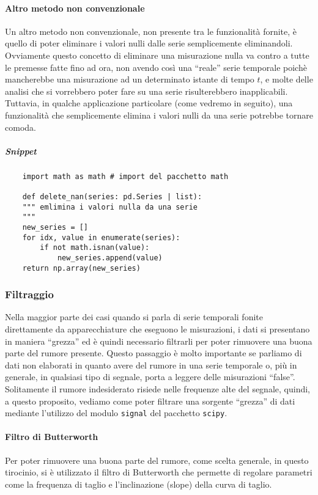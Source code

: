 \paragraph{Altro metodo non convenzionale}
Un altro metodo non convenzionale, non presente tra le funzionalità fornite,
è quello di poter eliminare i valori nulli dalle serie semplicemente
eliminandoli. Ovviamente questo concetto di eliminare una misurazione nulla va
contro a tutte le premesse fatte fino ad ora, non avendo così una ``reale''
serie temporale poichè mancherebbe una misurazione ad un determinato istante di tempo
$t$, e molte delle analisi che si vorrebbero poter fare su una serie risulterebbero
inapplicabili. 
Tuttavia, in qualche applicazione particolare (come vedremo in seguito), una funzionalità
che semplicemente elimina i valori nulli da una serie potrebbe tornare comoda.
\subparagraph*{Snippet}
\begin{verbatim}
    import math as math # import del pacchetto math

    def delete_nan(series: pd.Series | list):
    """ emlimina i valori nulla da una serie
    """
    new_series = []
    for idx, value in enumerate(series):
        if not math.isnan(value):
            new_series.append(value)
    return np.array(new_series)
\end{verbatim}


\subsubsection{Filtraggio}
Nella maggior parte dei casi quando si parla di serie temporali fonite direttamente 
da apparecchiature che eseguono le misurazioni, i dati si presentano in maniera
``grezza'' ed è quindi necessario filtrarli per poter rimuovere una buona parte
del rumore presente. Questo passaggio è molto importante se parliamo di dati non elaborati
in quanto avere del rumore in una serie temporale o, più in generale, in qualsiasi
tipo di segnale, porta a leggere delle misurazioni ``false''. Solitamente il rumore
indesiderato risiede nelle frequenze alte del segnale, quindi, a questo proposito,
vediamo come poter filtrare una sorgente ``grezza'' di dati mediante l'utilizzo del
modulo \texttt{signal} del pacchetto \texttt{scipy}.

\paragraph{Filtro di Butterworth}
Per poter rimuovere una buona parte del rumore, come scelta generale, in questo tirocinio,
si è utilizzato il filtro di Butterworth che permette di regolare parametri come la 
frequenza di taglio e l'inclinazione (slope) della curva di taglio.

